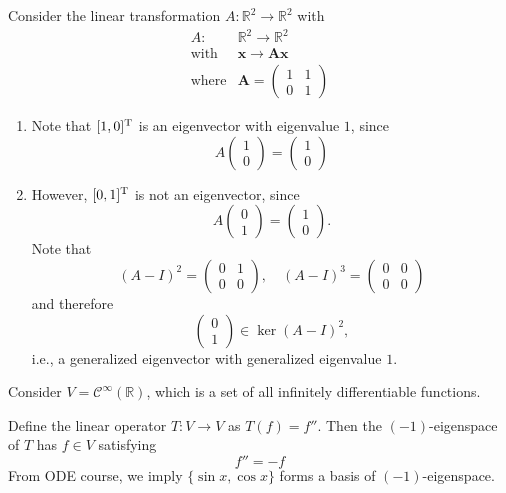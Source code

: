 \begin{example}
Consider the linear transformation $A:\mathbb{R}^2\to\mathbb{R}^2$ with
\[
\begin{array}{ll}
A:&\mathbb{R}^2\to\mathbb{R}^2\\
\text{with}&\bm x\to \bm A\bm x\\
\text{where}&\bm A=\begin{pmatrix}
1&1\\0&1
\end{pmatrix}
\end{array}
\]
\begin{enumerate}
\item
Note that $[1,0]^{\mathrm T}$ is an eigenvector with eigenvalue $1$, since
\[
A\begin{pmatrix}
1\\0
\end{pmatrix}=\begin{pmatrix}
1\\0
\end{pmatrix}
\]
\item
However, $[0,1]^{\mathrm T}$ is not an eigenvector, since
\[
A\begin{pmatrix}
0\\1
\end{pmatrix}=\begin{pmatrix}
1\\0
\end{pmatrix}.
\]
Note that 
\[
(A-I)^2=\begin{pmatrix}
0&1\\0&0
\end{pmatrix},\quad
(A-I)^3=\begin{pmatrix}
0&0\\0&0
\end{pmatrix}
\]
and therefore
\[
\begin{pmatrix}
0\\1
\end{pmatrix}\in\ker(A-I)^2,
\]
i.e., a generalized eigenvector with generalized eigenvalue $1$.
\end{enumerate}
\end{example}
\begin{example}
Consider $V=\mathcal{C}^\infty(\mathbb{R})$, which is a set of all infinitely differentiable functions.

Define the linear operator $T:V\to V$ as $T(f) = f''$. 
Then the $(-1)$-eigenspace of $T$ has $f\in V$ satisfying
\[
f''=-f
\]
From ODE course, we imply $\{\sin x,\cos x\}$ forms a basis of $(-1)$-eigenspace.
\end{example}

